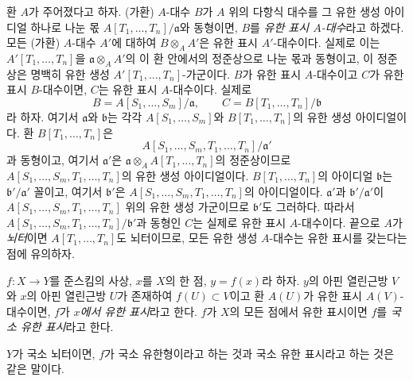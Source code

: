 \begin{env}[1.4.1]
\label{IV.1.4.1-fr}
환 $A$가 주어졌다고 하자. (가환) $A$-대수 $B$가 $A$ 위의 다항식
대수를 그 유한 생성 아이디얼 하나로 나눈 몫
$A[T_1,\ldots,T_n]/\mathfrak a$와 동형이면, $B$를
\emph{유한 표시 $A$-대수}라고 하겠다. 모든 (가환) $A$-대수
$A'$에 대하여 $B\otimes_AA'$은 유한 표시 $A'$-대수이다. 실제로
이는 $A'[T_1,\ldots,T_n]$을 $\mathfrak a\otimes_AA'$의 이 환
안에서의 정준상으로 나눈 몫과 동형이고, 이 정준상은 명백히 유한 생성
$A'[T_1,\ldots,T_n]$-가군이다. $B$가 유한 표시 $A$-대수이고
$C$가 유한 표시 $B$-대수이면, $C$는 유한 표시 $A$-대수이다.
실제로
\[
  B=A[S_1,\ldots,S_m]/\mathfrak a,\qquad
  C=B[T_1,\ldots,T_n]/\mathfrak b
\]
라 하자. 여기서 $\mathfrak a$와 $\mathfrak b$는 각각
$A[S_1,\ldots,S_m]$와 $B[T_1,\ldots,T_n]$의 유한 생성
아이디얼이다. 환 $B[T_1,\ldots,T_n]$은
\[
  A[S_1,\ldots,S_m,T_1,\ldots,T_n]/\mathfrak a'
\]
과 동형이고, 여기서 $\mathfrak a'$은
$\mathfrak a\otimes_AA[T_1,\ldots,T_n]$의 정준상이므로
$A[S_1,\ldots,S_m,T_1,\ldots,T_n]$의 유한 생성 아이디얼이다.
$B[T_1,\ldots,T_n]$의 아이디얼 $\mathfrak b$는
$\mathfrak b'/\mathfrak a'$ 꼴이고, 여기서 $\mathfrak b'$은
$A[S_1,\ldots,S_m,T_1,\ldots,T_n]$의 아이디얼이다.
$\mathfrak a'$과 $\mathfrak b'/\mathfrak a'$이
$A[S_1,\ldots,S_m,T_1,\ldots,T_n]$ 위의 유한 생성 가군이므로
$\mathfrak b'$도 그러하다. 따라서
$A[S_1,\ldots,S_m,T_1,\ldots,T_n]/\mathfrak b'$과 동형인
$C$는 실제로 유한 표시 $A$-대수이다. 끝으로 $A$가
\emph{뇌터}이면 $A[T_1,\ldots,T_n]$도 뇌터이므로, 모든 유한 생성
$A$-대수는 유한 표시를 갖는다는 점에 유의하자.
\end{env}

\begin{definition}[1.4.2]
\label{IV.1.4.2-fr}
$f:X\to Y$를 준스킴의 사상, $x$를 $X$의 한 점,
$y=f(x)$라 하자. $y$의 아핀 열린근방 $V$와 $x$의 아핀 열린근방
$U$가 존재하여 $f(U)\subset V$이고 환 $A(U)$가 유한 표시
$A(V)$-대수이면, $f$가 \emph{$x$에서 유한 표시}라고 한다. $f$가
$X$의 모든 점에서 유한 표시이면 $f$를 \emph{국소 유한 표시}라고 한다.
\end{definition}

$Y$가 국소 뇌터이면, $f$가 국소 유한형이라고 하는 것과 국소 유한
표시라고 하는 것은 같은 말이다.

